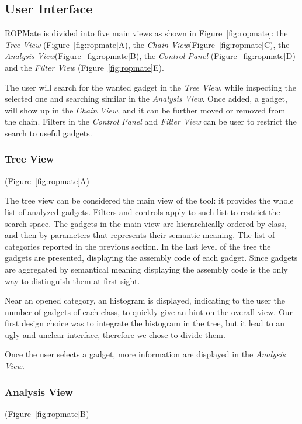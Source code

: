 \documentclass[twocolumn, 11pt]{article}
\begin{document}
\subsection{User Interface}
ROPMate is divided into five main views as shown in Figure~\ref{fig:ropmate}: the \textit{Tree View} (Figure~\ref{fig:ropmate}A), the \textit{Chain View}(Figure~\ref{fig:ropmate}C), the \textit{Analysis View}(Figure~\ref{fig:ropmate}B), the \textit{Control Panel} (Figure~\ref{fig:ropmate}D) and the \textit{Filter View} (Figure~\ref{fig:ropmate}E).

The user will search for the wanted gadget in the \textit{Tree View}, while inspecting the selected one and searching similar in the \textit{Analysis View}. Once added, a gadget, will show up in the \textit{Chain View}, and it can be further moved or removed from the chain. Filters in the \textit{Control Panel} and \textit{Filter View} can be user to restrict the search to useful gadgets.

\subsubsection{Tree View}
(Figure~\ref{fig:ropmate}A)

The tree view can be considered the main view of the tool: it provides the whole list of analyzed gadgets. Filters and controls apply to such list to restrict the search space. The gadgets in the main view are hierarchically ordered by class, and then by parameters that represents their semantic meaning. The list of categories reported in the previous section. In the last level of the tree the gadgets are presented, displaying the assembly code of each gadget. Since gadgets are aggregated by semantical meaning displaying the assembly code is the only way to distinguish them at first sight.

Near an opened category, an histogram is displayed, indicating to the user the number of gadgets of each class, to quickly give an hint on the overall view. Our first design choice was to integrate the histogram in the tree, but it lead to an ugly and unclear interface, therefore we chose to divide them.

Once the user selects a gadget, more information are displayed in the \textit{Analysis View}.

\subsubsection{Analysis View}
(Figure~\ref{fig:ropmate}B)
\end{document}
